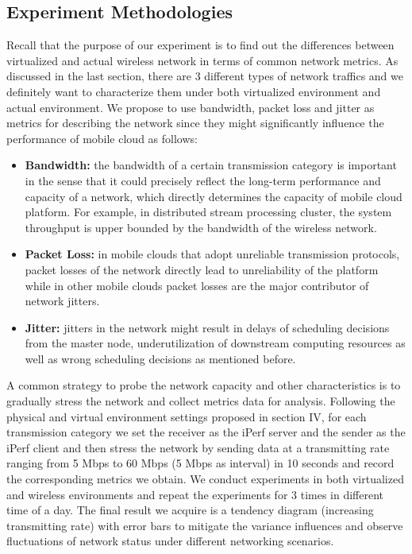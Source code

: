 \documentclass[journal,comsoc]{IEEEtran}
\begin{document}
\subsection{Experiment Methodologies}
Recall that the purpose of our experiment is to find out the differences between virtualized and actual wireless network in terms of common network metrics. As discussed in the last section, there are 3 different types of network traffics and we definitely want to characterize them under both virtualized environment and actual environment. We propose to use bandwidth, packet loss and jitter as metrics for describing the network since they might significantly influence the performance of mobile cloud as follows:
\begin{itemize}
	\item {\bf Bandwidth: }the bandwidth of a certain transmission category is important in the sense that it could precisely reflect the long-term performance and capacity of a network, which directly determines the capacity of mobile cloud platform. For example, in distributed stream processing cluster, the system throughput is upper bounded by the bandwidth of the wireless network.
	\item {\bf Packet Loss: }in mobile clouds that adopt unreliable transmission protocols, packet losses of the network directly lead to unreliability of the platform while in other mobile clouds packet losses are the major contributor of network jitters.
	\item {\bf Jitter: }jitters in the network might result in delays of scheduling decisions from the master node, underutilization of downstream computing resources as well as wrong scheduling decisions as mentioned before.
\end{itemize}
A common strategy to probe the network capacity and other characteristics is to gradually stress the network and collect metrics data for analysis. Following the physical and virtual environment settings proposed in section IV, for each transmission category we set the receiver as the iPerf server and the sender as the iPerf client and then stress the network by sending data at a transmitting rate ranging from 5 Mbps to 60 Mbps (5 Mbps as interval) in 10 seconds and record the corresponding metrics we obtain. We conduct experiments in both virtualized and wireless environments and repeat the experiments for 3 times in different time of a day. The final result we acquire is a tendency diagram (increasing transmitting rate) with error bars to mitigate the variance influences and observe fluctuations of network status under different networking scenarios.
\end{document}
